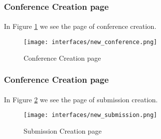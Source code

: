 	\subsubsection{Conference Creation page}
		\paragraph{}
		In Figure \ref{fig:new-conf} we see the page of conference creation.
		
			\begin{figure}
				\centering
				\texttt{[image: interfaces/new\_conference.png]}
				\caption{Conference Creation page}
				\label{fig:new-conf}
			\end{figure}
	
	\subsubsection{Conference Creation page}
		\paragraph{}
		In Figure \ref{fig:new-sub} we see the page of submission creation.
		
			\begin{figure}
				\centering
				\texttt{[image: interfaces/new\_submission.png]}
				\caption{Submission Creation page}
				\label{fig:new-sub}
			\end{figure}